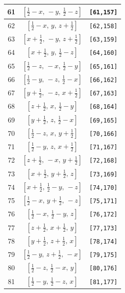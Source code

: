 \documentclass[fleqn,8pt]{jsarticle}
\begin{document}
\begin{longtable}{ccc}
61 & $\left[ \frac{1}{2} - x,\, - y,\, \frac{1}{2} - z \right]$ & {\tt [61,157]} \\ \hline
62 & $\left[ \frac{1}{2} - x,\, y,\, z + \frac{1}{2} \right]$ & {\tt [62,158]} \\ \hline
63 & $\left[ x + \frac{1}{2},\, - y,\, z + \frac{1}{2} \right]$ & {\tt [63,159]} \\ \hline
64 & $\left[ x + \frac{1}{2},\, y,\, \frac{1}{2} - z \right]$ & {\tt [64,160]} \\ \hline
65 & $\left[ \frac{1}{2} - z,\, - x,\, \frac{1}{2} - y \right]$ & {\tt [65,161]} \\ \hline
66 & $\left[ \frac{1}{2} - y,\, - z,\, \frac{1}{2} - x \right]$ & {\tt [66,162]} \\ \hline
67 & $\left[ y + \frac{1}{2},\, - z,\, x + \frac{1}{2} \right]$ & {\tt [67,163]} \\ \hline
68 & $\left[ z + \frac{1}{2},\, x,\, \frac{1}{2} - y \right]$ & {\tt [68,164]} \\ \hline
69 & $\left[ y + \frac{1}{2},\, z,\, \frac{1}{2} - x \right]$ & {\tt [69,165]} \\ \hline
70 & $\left[ \frac{1}{2} - z,\, x,\, y + \frac{1}{2} \right]$ & {\tt [70,166]} \\ \hline
71 & $\left[ \frac{1}{2} - y,\, z,\, x + \frac{1}{2} \right]$ & {\tt [71,167]} \\ \hline
72 & $\left[ z + \frac{1}{2},\, - x,\, y + \frac{1}{2} \right]$ & {\tt [72,168]} \\ \hline
73 & $\left[ x + \frac{1}{2},\, y + \frac{1}{2},\, z \right]$ & {\tt [73,169]} \\ \hline
74 & $\left[ x + \frac{1}{2},\, \frac{1}{2} - y,\, - z \right]$ & {\tt [74,170]} \\ \hline
75 & $\left[ \frac{1}{2} - x,\, y + \frac{1}{2},\, - z \right]$ & {\tt [75,171]} \\ \hline
76 & $\left[ \frac{1}{2} - x,\, \frac{1}{2} - y,\, z \right]$ & {\tt [76,172]} \\ \hline
77 & $\left[ z + \frac{1}{2},\, x + \frac{1}{2},\, y \right]$ & {\tt [77,173]} \\ \hline
78 & $\left[ y + \frac{1}{2},\, z + \frac{1}{2},\, x \right]$ & {\tt [78,174]} \\ \hline
79 & $\left[ \frac{1}{2} - y,\, z + \frac{1}{2},\, - x \right]$ & {\tt [79,175]} \\ \hline
80 & $\left[ \frac{1}{2} - z,\, \frac{1}{2} - x,\, y \right]$ & {\tt [80,176]} \\ \hline
81 & $\left[ \frac{1}{2} - y,\, \frac{1}{2} - z,\, x \right]$ & {\tt [81,177]} \\ \hline

\end{longtable}
\end{document}
